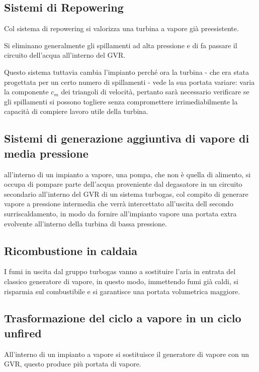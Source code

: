 \subsection{Sistemi di Repowering}
\begin{adjustwidth}{2in}{}
	Col sistema di repowering si valorizza una turbina a vapore già preesistente.
	
	Si eliminano generalmente gli spillamenti ad alta pressione e di fa passare il circuito dell'acqua all'interno del GVR. 
	
	Questo sistema tuttavia cambia l'impianto perché ora la turbina - che era stata progettata per un certo numero di spillamenti - vede la sua portata variare: varia la componente $c_m$ dei triangoli di velocità, pertanto sarà necessario verificare se gli spillamenti si possono togliere senza compromettere irrimediabilmente la capacità di compiere lavoro utile della turbina. 
\end{adjustwidth}

\subsection{Sistemi di generazione aggiuntiva di vapore di media pressione}
\begin{adjustwidth}{2in}{}
	all'interno di un impianto a vapore, una pompa, che non è quella di alimento, si occupa di pompare parte dell'acqua proveniente dal degasatore in un circuito secondario all'interno del GVR di un sistema turbogas, col compito di generare vapore a pressione intermedia che verrà intercettato all'uscita dell secondo surriscaldamento, in modo da fornire all'impianto vapore una portata extra evolvente all'interno della turbina di bassa pressione.
\end{adjustwidth}




\subsection{Ricombustione in caldaia}
\begin{adjustwidth}{2in}{}
		I fumi in uscita dal gruppo turbogas vanno a sostituire l'aria in entrata del classico generatore di vapore, in questo modo, immettendo fumi già caldi, si risparmia sul combustibile e si garantisce una portata volumetrica maggiore.
\end{adjustwidth}

\subsection{Trasformazione del ciclo a vapore in un ciclo unfired}
\begin{adjustwidth}{2in}{}
	All'interno di un impianto a vapore si sostituisce il generatore di vapore con un GVR, questo produce più portata di vapore. 
\end{adjustwidth}